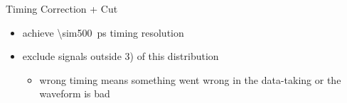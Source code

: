 \begin{frame}[noframenumbering]{Timing Correction + Cut}

	
	\begin{itemize}\itemfill
		\item achieve \SI{\sim500}{\pico\second} timing resolution
		\item exclude signals outside \SI{3}{\sigma}) of this distribution
		\begin{itemize}
			\item wrong timing means something went wrong in the data-taking or the waveform is bad
		\end{itemize}
	\end{itemize}

\end{frame}
